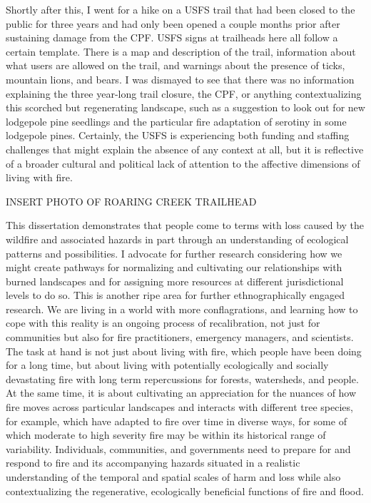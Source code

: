 \documentclass[
]{article}
\begin{document}
Shortly after this, I went for a hike on a USFS trail that had been closed to the public for three years and had only been opened a couple months prior after sustaining damage from the CPF. USFS signs at trailheads here all follow a certain template. There is a map and description of the trail, information about what users are allowed on the trail, and warnings about the presence of ticks, mountain lions, and bears. I was dismayed to see that there was no information explaining the three year-long trail closure, the CPF, or anything contextualizing this scorched but regenerating landscape, such as a suggestion to look out for new lodgepole pine seedlings and the particular fire adaptation of serotiny in some lodgepole pines. Certainly, the USFS is experiencing both funding and staffing challenges that might explain the absence of any context at all, but it is reflective of a broader cultural and political lack of attention to the affective dimensions of living with fire.

INSERT PHOTO OF ROARING CREEK TRAILHEAD

This dissertation demonstrates that people come to terms with loss caused by the wildfire and associated hazards in part through an understanding of ecological patterns and possibilities. I advocate for further research considering how we might create pathways for normalizing and cultivating our relationships with burned landscapes and for assigning more resources at different jurisdictional levels to do so. This is another ripe area for further ethnographically engaged research. We are living in a world with more conflagrations, and learning how to cope with this reality is an ongoing process of recalibration, not just for communities but also for fire practitioners, emergency managers, and scientists. The task at hand is not just about living with fire, which people have been doing for a long time, but about living with potentially ecologically and socially devastating fire with long term repercussions for forests, watersheds, and people. At the same time, it is about cultivating an appreciation for the nuances of how fire moves across particular landscapes and interacts with different tree species, for example, which have adapted to fire over time in diverse ways, for some of which moderate to high severity fire may be within its historical range of variability. Individuals, communities, and governments need to prepare for and respond to fire and its accompanying hazards situated in a realistic understanding of the temporal and spatial scales of harm and loss while also contextualizing the regenerative, ecologically beneficial functions of fire and flood.
\end{document}
